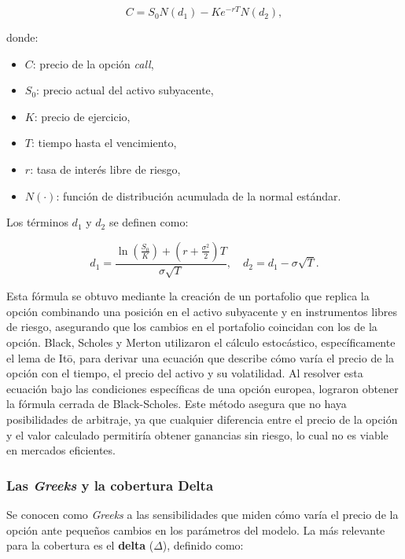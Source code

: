 \documentclass[11pt,a4paper,spanish]{article}
\numberwithin{equation}{section} %
\begin{document}
\begin{equation}
C = S_0 N(d_1) - K e^{-rT} N(d_2),
\end{equation}

donde:
\begin{itemize}
    \item $C$: precio de la opción \textit{call},
    \item $S_0$: precio actual del activo subyacente,
    \item $K$: precio de ejercicio,
    \item $T$: tiempo hasta el vencimiento,
    \item $r$: tasa de interés libre de riesgo,
    \item $N(\cdot)$: función de distribución acumulada de la normal estándar.
\end{itemize}

Los términos $d_1$ y $d_2$ se definen como:

\begin{equation}
d_1 = \frac{\ln\left(\frac{S_0}{K}\right) + \left(r + \frac{\sigma^2}{2}\right)T}{\sigma \sqrt{T}}, \quad
d_2 = d_1 - \sigma \sqrt{T}.
\label{eq:d1-d2}
\end{equation}

Esta fórmula se obtuvo mediante la creación de un portafolio que replica la opción combinando una posición en el activo subyacente y en instrumentos libres de riesgo, asegurando que los cambios en el portafolio coincidan con los de la opción. Black, Scholes y Merton utilizaron el cálculo estocástico, específicamente el lema de It\={o}, para derivar una ecuación que describe cómo varía el precio de la opción con el tiempo, el precio del activo y su volatilidad. Al resolver esta ecuación bajo las condiciones específicas de una opción europea, lograron obtener la fórmula cerrada de Black-Scholes. Este método asegura que no haya posibilidades de arbitraje, ya que cualquier diferencia entre el precio de la opción y el valor calculado permitiría obtener ganancias sin riesgo, lo cual no es viable en mercados eficientes. 

\subsubsection{Las \textit{Greeks} y la cobertura Delta}

Se conocen como \textit{Greeks} a las sensibilidades que miden cómo varía el precio de la opción ante pequeños cambios en los parámetros del modelo. La más relevante para la cobertura es el \textbf{delta} ($\Delta$), definido como:
\end{document}
